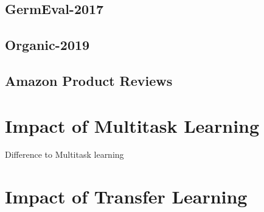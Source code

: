 \subsection{GermEval-2017}
\label{sec:06_ResultsGermEval}

\subsection{Organic-2019}

\subsection{Amazon Product Reviews}

\section{Impact of Multitask Learning}
Difference to Multitask learning



\section{Impact of Transfer Learning}

